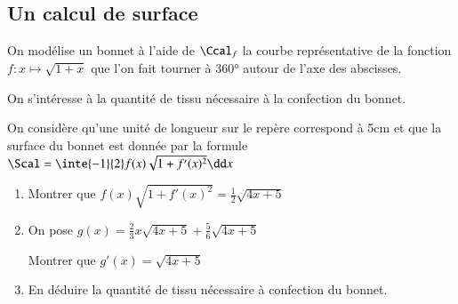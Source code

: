 \documentclass[oneside,12pt]{article}          %
\begin{document}
\subsection{Un calcul de surface}
\begin{minipage}{0.49\textwidth}
On modélise un bonnet à l'aide de $\Ccal_f$ la courbe représentative de la fonction $f:x\mapsto\sqrt{1+x}$ que l'on fait tourner à 360° autour de l'axe des abscisses.

On s'intéresse à la quantité de tissu nécessaire à la confection du bonnet.

On considère qu'une unité de longueur sur le repère correspond à 5cm et que la surface du bonnet est donnée par la formule\\[5pt]
$\Scal=\inte{-1}{2}f(x)\sqrt{1+f'(x)^2}\dd x$

\begin{enumerate}
    \item Montrer que $f(x)\sqrt{1+f'(x)^2} = \frac{1}{2}\sqrt{4x+5}$
    \item On pose $g(x)=\frac{2}{3}x\sqrt{4x+5}+\frac{5}{6}\sqrt{4x+5}$
    
    Montrer que $g'(x)=\sqrt{4x+5}$
    \item En déduire la quantité de tissu nécessaire à confection du bonnet.
\end{enumerate}


\end{minipage}
\hspace{30pt}
\end{document}
